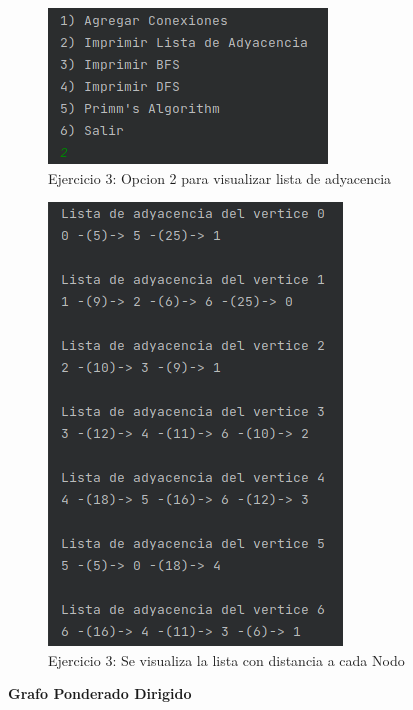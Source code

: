 \documentclass{article}
\begin{document}
			\begin{figure}[H]
				\centering
				\includegraphics[scale= 1]{images/e35.png}
				\caption*{Ejercicio 3: Opcion 2 para visualizar lista de adyacencia}
			\end{figure}
		
			\begin{figure}[H]
				\centering
				\includegraphics[scale= 1]{images/e36.png}
				\caption*{Ejercicio 3: Se visualiza la lista con distancia a cada Nodo}
			\end{figure}
		
			\newpage
		
			\textbf{Grafo Ponderado Dirigido}
			
\end{document}
